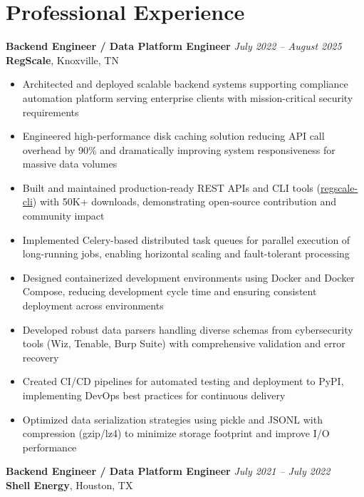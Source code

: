 \documentclass[10pt,letterpaper]{article}
\begin{document}
\section{Professional Experience}

\noindent\textbf{Backend Engineer / Data Platform Engineer} \hfill \textit{July 2022 -- August 2025} \\
\textbf{RegScale}, Knoxville, TN

\begin{itemize}
    \item Architected and deployed scalable backend systems supporting compliance automation platform serving enterprise clients with mission-critical security requirements
    \item Engineered high-performance disk caching solution reducing API call overhead by 90\% and dramatically improving system responsiveness for massive data volumes
    \item Built and maintained production-ready REST APIs and CLI tools (\href{https://pypi.org/project/regscale-cli/}{regscale-cli}) with 50K+ downloads, demonstrating open-source contribution and community impact
    \item Implemented Celery-based distributed task queues for parallel execution of long-running jobs, enabling horizontal scaling and fault-tolerant processing
    \item Designed containerized development environments using Docker and Docker Compose, reducing development cycle time and ensuring consistent deployment across environments
    \item Developed robust data parsers handling diverse schemas from cybersecurity tools (Wiz, Tenable, Burp Suite) with comprehensive validation and error recovery
    \item Created CI/CD pipelines for automated testing and deployment to PyPI, implementing DevOps best practices for continuous delivery
    \item Optimized data serialization strategies using pickle and JSONL with compression (gzip/lz4) to minimize storage footprint and improve I/O performance
\end{itemize}

\vspace{8pt}
\noindent\textbf{Backend Engineer / Data Platform Engineer} \hfill \textit{July 2021 -- July 2022} \\
\textbf{Shell Energy}, Houston, TX
\end{document}
